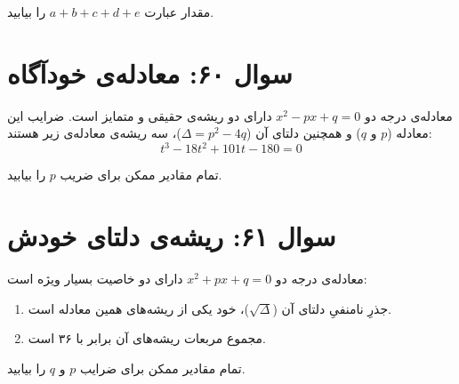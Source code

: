 \documentclass[12pt]{article}
\begin{document}
	مقدار عبارت \( a + b + c + d + e \) را بیابید.
	
	\vspace{1cm}
	\hrulefill
	\vspace{1cm}
	
	\section*{سوال ۶۰: معادله‌ی خودآگاه}
	معادله‌ی درجه دو \( x^2 - px + q = 0 \) دارای دو ریشه‌ی حقیقی و متمایز است. ضرایب این معادله (\(p\) و \(q\)) و همچنین دلتای آن (\( \Delta = p^2 - 4q \))، سه ریشه‌ی معادله‌ی زیر هستند:
	\begin{displaymath}
		t^3 - 18t^2 + 101t - 180 = 0
	\end{displaymath}
	\vspace{0.5cm}
	
	تمام مقادیر ممکن برای ضریب \(p\) را بیابید.
	
	\vspace{1cm}
	\hrulefill
	\vspace{1cm}
	
	\section*{سوال ۶۱: ریشه‌ی دلتای خودش}
	معادله‌ی درجه دو \( x^2 + px + q = 0 \) دارای دو خاصیت بسیار ویژه است:
	\begin{enumerate}[label=(\roman*)]
		\item جذرِ نامنفیِ دلتای آن (\( \sqrt{\Delta} \))، خود یکی از ریشه‌های همین معادله است.
		\item مجموع مربعات ریشه‌های آن برابر با ۳۶ است.
	\end{enumerate}
	\vspace{0.5cm}
	
	تمام مقادیر ممکن برای ضرایب \(p\) و \(q\) را بیابید.
	
	\vspace{1cm}
	\hrulefill
	\vspace{1cm}
	
\end{document}
